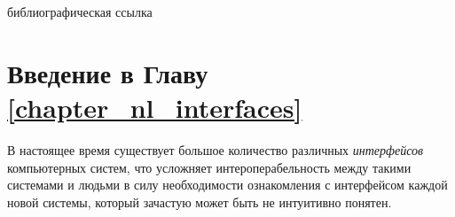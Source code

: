 \begin{SCn}
	\begin{scnrelfromlist}{библиографическая ссылка}
	\end{scnrelfromlist}
\end{SCn}

\bigskip

\section*{Введение в Главу \ref{chapter_nl_interfaces}}

В настоящее время существует большое количество различных \textit{интерфейсов} компьютерных систем, что усложняет интероперабельность между такими системами и людьми в силу необходимости ознакомления с интерфейсом каждой новой системы, который зачастую может быть не интуитивно понятен.

